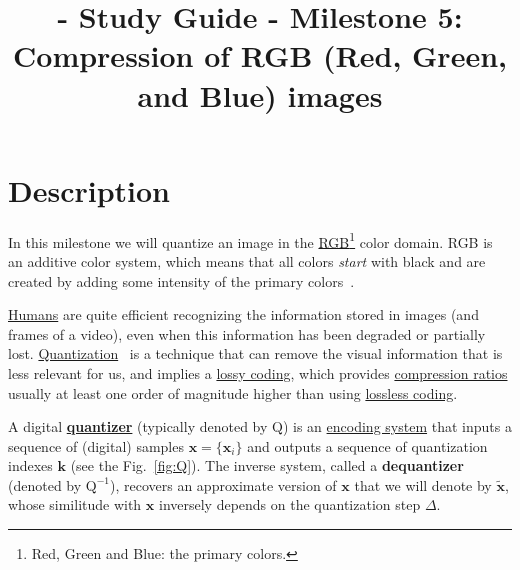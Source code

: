 
\title{\SM{} - Study Guide - Milestone 5: Compression of RGB (Red, Green, and Blue) images}

\maketitle

\tableofcontents

\section{Description}
In this milestone we will quantize an image in the
\href{https://en.wikipedia.org/wiki/RGB_color_model}{RGB\footnote{Red,
    Green and Blue: the primary colors.} color domain}. RGB is an
additive color system, which means that all colors \emph{start} with
black and are created by adding some intensity of the primary
colors~\cite{burger2016digital}.

\href{https://en.wikipedia.org/wiki/Visual_system}{Humans} are quite
efficient recognizing the information stored in images (and frames of
a video), even when this information has been degraded or partially
lost. \href{https://en.wikipedia.org/wiki/Quantization_(signal_processing)}{Quantization}~\cite{sayood2017introduction,vetterli2014foundations}
is a technique that can remove the visual information that is less
relevant for us, and implies a
\href{https://en.wikipedia.org/wiki/Lossy_compression}{lossy coding},
which provides
\href{https://en.wikipedia.org/wiki/Data_compression_ratio}{compression
  ratios} usually at least one order of magnitude higher than using
\href{https://en.wikipedia.org/wiki/Lossless_compression}{lossless
  coding}.

A digital
\href{https://en.wikipedia.org/wiki/Quantization_(signal_processing)}{\textbf{quantizer}}
(typically denoted by $\text{Q}$) is an
\href{https://en.wikipedia.org/wiki/Data_compression}{encoding system}
that inputs a sequence of (digital) samples
${\mathbf x}=\{{\mathbf x}_i\}$ and outputs a sequence of quantization
indexes ${\mathbf k}$ (see the Fig.~\ref{fig:Q}). The inverse system,
called a \textbf{dequantizer} (denoted by $\text{Q}^{-1}$), recovers
an approximate version of ${\mathbf x}$ that we will denote by
$\tilde{{\mathbf x}}$, whose similitude with ${\mathbf x}$ inversely
depends on the quantization step $\Delta$. %

